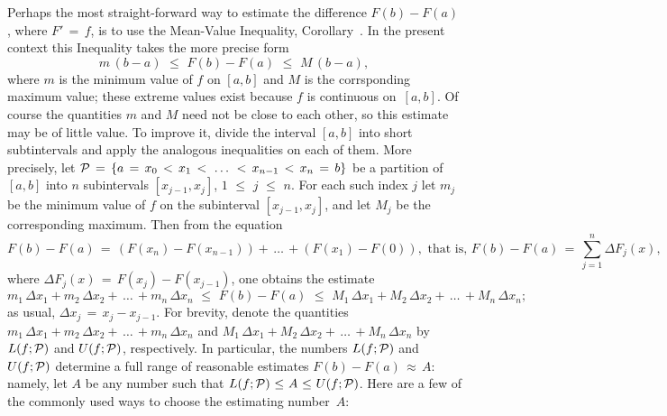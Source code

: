 \V

        Perhaps the most straight-forward way to estimate the difference $F(b) - F(a)$, where $F' \,=\, f$, is to use the Mean-Value Inequality, 
    Corollary~. In the present context this Inequality takes the more precise form
        \begin{displaymath}
        m\,(b-a)\,\,{\leq}\,\,F(b)-F(a)\,\,{\leq}\,\,M\,(b-a),
        \end{displaymath}
    where $m$ is the minimum value of $f$ on $[a,b]$ and $M$ is the corrsponding maximum value; these extreme values exist because $f$ is continuous on~$[a,b]$.
    Of course the quantities $m$ and $M$ need not be close to each other, so this estimate may be of little value.
    To improve it, divide the interval $[a,b]$ into short subtintervals and apply the analogous inequalities on each of them.
    More precisely, let ${\cal P} \,=\, \{a \,=\, x_{0}\,<\,x_{1}\,<\,\,{\ldots}\,\,<\,x_{n-1}\,<\,x_{n}\,=\,b\}$
    be a partition of $[a,b]$ into $n$ subintervals $[x_{j-1},x_{j}]$, $1\,\,{\leq}\,\,j\,\,{\leq}\,\,n$.
    For each such index $j$ let $m_{j}$ be the minimum value of $f$ on the subinterval $[x_{j-1},x_{j}]$, and let $M_{j}$ be the corresponding maximum.
    Then from the equation
        \begin{displaymath}
        F(b) - F(a) \,=\, (F(x_{n})-F(x_{n-1})) + \,{\ldots}\, + (F(x_{1})-F(0)), \mbox{ that is, }
        F(b) - F(a) \,=\, \sum_{j=1}^{n} {\Delta}F_{j}(x),
        \end{displaymath}
    where ${\Delta}F_{j}(x) \,=\, F(x_{j})-F(x_{j-1})$, one obtains the estimate
        \begin{displaymath}
        m_{1}\,{\Delta}x_{1} + m_{2}\,{\Delta}x_{2} + \,{\ldots}\,+ m_{n}\,{\Delta}x_{n}
        \,\,{\leq}\,\,F(b) - F(a)\,\,{\leq}\,\,
        M_{1}\,{\Delta}x_{1} + M_{2}\,{\Delta}x_{2} + \,{\ldots}\,+ M_{n}\,{\Delta}x_{n};
        \end{displaymath}
    as usual, ${\Delta}x_{j} \,=\, x_{j}-x_{j-1}$. For brevity, denote the quantities
    $m_{1}\,{\Delta}x_{1} + m_{2}\,{\Delta}x_{2} + \,{\ldots}\,+ m_{n}\,{\Delta}x_{n}$ and
    $M_{1}\,{\Delta}x_{1} + M_{2}\,{\Delta}x_{2} + \,{\ldots}\,+ M_{n}\,{\Delta}x_{n}$ by $L(f;{\cal P})$ and $U(f;{\cal P})$, respectively.
    In particular, the numbers $L(f;{\cal P})$ and $U(f;{\cal P})$ determine a full range of reasonable estimates $F(b)-F(a) \,{\approx}\, A$:
    namely, let $A$ be any number such that $L(f;{\cal P})\,\,{\leq}\,\,A\,\,{\leq}\,\,U(f;{\cal P})$.
    Here are a few of the commonly used ways to choose the estimating number~$A$:


